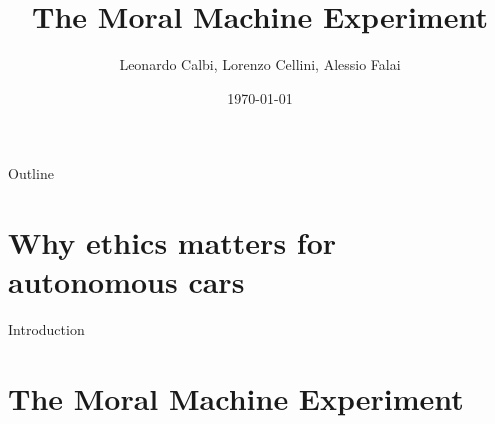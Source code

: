 \documentclass[aspectratio=169]{beamer}
\title[MME]{The Moral Machine Experiment}
\author{Leonardo Calbi, Lorenzo Cellini, Alessio Falai\\}
\institute{Alma Mater Studiorum - University of Bologna}
\date{\today}
\begin{document}
\maketitle

\begin{frame}{Outline}
    \tableofcontents
\end{frame}

\section{Why ethics matters for autonomous cars}
\begin{frame}
    Introduction
\end{frame}

\section{The Moral Machine Experiment}
\end{document}
